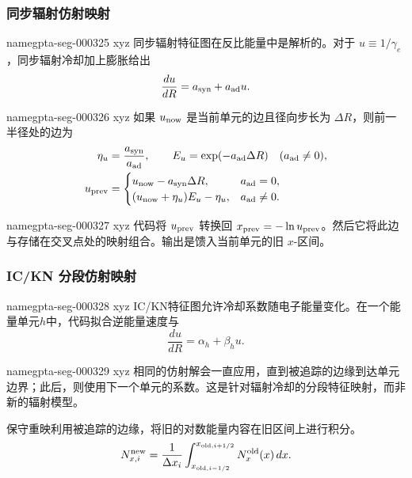 \documentclass[twocolumn]{aastex702}
\makeatletter
\providecommand{\gptareaderanchor}[1]{\pdfdest name{#1} xyz}%
\providecommand{\gptareaderanchor}[1]{\special{pdf:dest (#1) [ @thispage /XYZ @xpos @ypos null ]}}%
\makeatother
\begin{document}
\subsubsection{同步辐射仿射映射}


\gptareaderanchor{gpta-seg-000325}%
同步辐射特征图在反比能量中是解析的。对于 \(u\equiv1/\gamma_e\)，同步辐射冷却加上膨胀给出
\begin{equation}
\frac{du}{dR}=a_{\rm syn}+a_{\rm ad}u .
\end{equation}

\gptareaderanchor{gpta-seg-000326}%
如果 \(u_{\rm now}\) 是当前单元的边且径向步长为 \(\Delta R\)，则前一半径处的边为
\begin{equation}
\begin{aligned}
\eta_u&=\frac{a_{\rm syn}}{a_{\rm ad}},\qquad
E_u=\exp(-a_{\rm ad}\Delta R)
\quad(a_{\rm ad}\ne0),\\
u_{\rm prev}&=
\begin{cases}
u_{\rm now}-a_{\rm syn}\Delta R, & a_{\rm ad}=0,\\
(u_{\rm now}+\eta_u)E_u-\eta_u, & a_{\rm ad}\ne0 .
\end{cases}
\end{aligned}
\end{equation}

\gptareaderanchor{gpta-seg-000327}%
代码将 \(u_{\rm prev}\) 转换回 \(x_{\rm prev}=-\ln u_{\rm prev}\)。然后它将此边与存储在交叉点处的映射组合。输出是馈入当前单元的旧 \(x\)-区间。

\subsubsection{IC/KN 分段仿射映射}


\gptareaderanchor{gpta-seg-000328}%
IC/KN特征图允许冷却系数随电子能量变化。在一个能量单元\(h\)中，代码拟合逆能量速度与
\begin{equation}
\frac{du}{dR}=\alpha_h+\beta_hu .
\end{equation}

\gptareaderanchor{gpta-seg-000329}%
相同的仿射解会一直应用，直到被追踪的边缘到达单元边界；此后，则使用下一个单元的系数。这是针对辐射冷却的分段特征映射，而非新的辐射模型。

保守重映利用被追踪的边缘，将旧的对数能量内容在旧区间上进行积分。
\begin{equation}
N_{x,i}^{\rm new}
=\frac{1}{\Delta x_i}
\int_{x_{{\rm old},i-1/2}}^{x_{{\rm old},i+1/2}}
N_x^{\rm old}(x)\,dx .
\end{equation}
\end{document}
